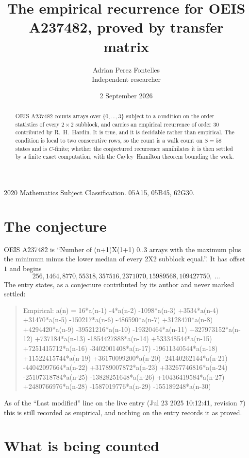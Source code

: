 \documentclass[11pt,a4paper]{article}
\title{The empirical recurrence for OEIS A237482, proved by transfer matrix}
\author{Adrian Perez Fontelles\\ \small Independent researcher}
\date{2 September 2026}
\theoremstyle{plain}
\theoremstyle{definition}
\begin{document}
\maketitle

\begin{abstract}
OEIS A237482 counts arrays over $\{0,\dots,3\}$ subject to a condition on the order
statistics of every $2\times2$ subblock, and carries an empirical recurrence of order
$30$ contributed by R.~H.~Hardin. It is true, and it is decidable rather than empirical.
The condition is local to two consecutive rows, so the count is a walk count on $S=58$
states and is $C$-finite; whether the conjectured recurrence annihilates it is then settled by
a finite exact computation, with the Cayley--Hamilton theorem bounding the work.
\end{abstract}

\noindent\small 2020 Mathematics Subject Classification. 05A15, 05B45, 62G30.\normalsize

\section{The conjecture}

OEIS A237482 is ``Number of (n+1)X(1+1) 0..3 arrays with the maximum plus the minimum minus the lower median of every 2X2 subblock equal.''. It has offset $1$ and begins
\[
256, 1464, 8770, 55318, 357516, 2371070, 15989568, 109427750,\ \dots
\]
The entry states, as a conjecture contributed by its author and never marked settled:
\begin{quote}
Empirical: a(n) = 16*a(n-1) -4*a(n-2) -1098*a(n-3) +3534*a(n-4) +31470*a(n-5) -150217*a(n-6) -486590*a(n-7) +3128470*a(n-8) +4294420*a(n-9) -39521216*a(n-10) -19320464*a(n-11) +327973152*a(n-12) +737184*a(n-13) -1854427888*a(n-14) +533348544*a(n-15) +7251415712*a(n-16) -3402001408*a(n-17) -19611340544*a(n-18) +11522415744*a(n-19) +36170099200*a(n-20) -24140262144*a(n-21) -44042097664*a(n-22) +31789007872*a(n-23) +33267746816*a(n-24) -25107318784*a(n-25) -13828251648*a(n-26) +10436419584*a(n-27) +2480766976*a(n-28) -1587019776*a(n-29) -155189248*a(n-30)
\end{quote}
As of the ``Last modified'' line on the live entry (Jul 23 2025 10:12:41, revision 7) this is still
recorded as empirical, and nothing on the entry records it as proved.

\section{What is being counted}
\end{document}
